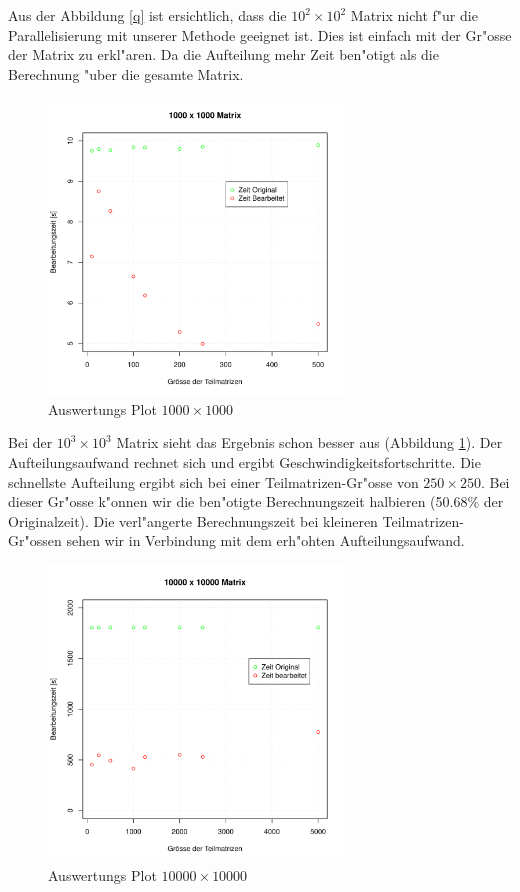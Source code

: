 \begin{refsection}
Aus der Abbildung \ref{q} ist ersichtlich, dass die $10^2\times10^2$
Matrix nicht f"ur die Parallelisierung mit unserer Methode geeignet
ist. Dies ist einfach mit der Gr"osse der Matrix zu erkl"aren. Da die
Aufteilung mehr Zeit ben"otigt als die Berechnung "uber die gesamte
Matrix.

\begin{figure}
\begin{center}
\includegraphics[width=0.7\textwidth]{./mapreduce/PC1000.pdf}
\end{center}
\caption{Auswertungs Plot $1000\times1000$}
\label{qq}
\end{figure}

Bei der $10^3\times10^3$ Matrix sieht das Ergebnis schon besser aus
(Abbildung \ref{qq}). Der Aufteilungsaufwand rechnet sich und ergibt
Geschwindigkeitsfortschritte. Die schnellste Aufteilung ergibt sich
bei einer Teilmatrizen-Gr"osse von $250\times250$. Bei dieser Gr"osse
k"onnen wir die ben"otigte Berechnungszeit halbieren (50.68\% der
Originalzeit). Die verl"angerte Berechnungszeit bei kleineren
Teilmatrizen-Gr"ossen sehen wir in Verbindung mit dem erh"ohten
Aufteilungsaufwand.

\begin{figure}
\begin{center}
\includegraphics[width=0.7\textwidth]{./mapreduce/PC10000.pdf}
\end{center}
\caption{Auswertungs Plot $10000\times10000$}
\label{qqq}
\end{figure}


\end{refsection}
